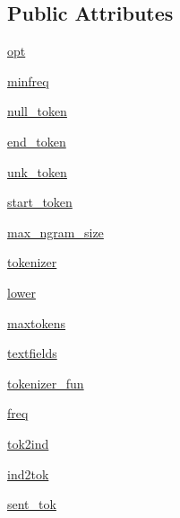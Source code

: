 \subsection*{Public Attributes}
\begin{DoxyCompactItemize}
\item 
\hyperlink{classparlai_1_1core_1_1dict_1_1DictionaryAgent_a6c0d7c9c31b38e99b747be88395d689f}{opt}
\item 
\hyperlink{classparlai_1_1core_1_1dict_1_1DictionaryAgent_a50f58c22b998eb75c24393cbccc759a4}{minfreq}
\item 
\hyperlink{classparlai_1_1core_1_1dict_1_1DictionaryAgent_a9db44f9566d7f7678c5528e7c44d76a8}{null\+\_\+token}
\item 
\hyperlink{classparlai_1_1core_1_1dict_1_1DictionaryAgent_a793811f6f290bfcb714fa865745cdcb4}{end\+\_\+token}
\item 
\hyperlink{classparlai_1_1core_1_1dict_1_1DictionaryAgent_ae741c47302ea1add9cc040d68032c38a}{unk\+\_\+token}
\item 
\hyperlink{classparlai_1_1core_1_1dict_1_1DictionaryAgent_a5ef1b542b4efa5228e957c1e167195bd}{start\+\_\+token}
\item 
\hyperlink{classparlai_1_1core_1_1dict_1_1DictionaryAgent_a834b2cdfb978f230b5131e63cf1e7492}{max\+\_\+ngram\+\_\+size}
\item 
\hyperlink{classparlai_1_1core_1_1dict_1_1DictionaryAgent_a77e32c39f829ba158fd8b4ba834f4db3}{tokenizer}
\item 
\hyperlink{classparlai_1_1core_1_1dict_1_1DictionaryAgent_a0dc4620f2829a15d822cc29e7fccd677}{lower}
\item 
\hyperlink{classparlai_1_1core_1_1dict_1_1DictionaryAgent_abeece13fbdc77b7479d4fb5d02858816}{maxtokens}
\item 
\hyperlink{classparlai_1_1core_1_1dict_1_1DictionaryAgent_a771c6e70dd433cdc076fd1261f2f3845}{textfields}
\item 
\hyperlink{classparlai_1_1core_1_1dict_1_1DictionaryAgent_a0d3436a2a958f18177df71f59f48e72e}{tokenizer\+\_\+fun}
\item 
\hyperlink{classparlai_1_1core_1_1dict_1_1DictionaryAgent_af3e428f4a5d8ef3a2fc02b01a6f659f2}{freq}
\item 
\hyperlink{classparlai_1_1core_1_1dict_1_1DictionaryAgent_a5955a6e5b031b8540694b847a9889bcd}{tok2ind}
\item 
\hyperlink{classparlai_1_1core_1_1dict_1_1DictionaryAgent_af425a3810b9c85ac73d9b77a9ee100e6}{ind2tok}
\item 
\hyperlink{classparlai_1_1core_1_1dict_1_1DictionaryAgent_ad883df8ef1d397ea93dd9d018822720e}{sent\+\_\+tok}

\end{DoxyCompactItemize}
